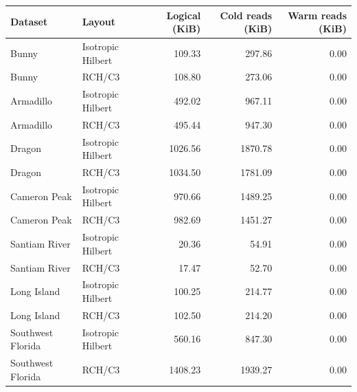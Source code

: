 \begin{tabular}{llrrr}
Dataset & Layout & Logical (KiB) & Cold reads (KiB) & Warm reads (KiB) \\
\hline
Bunny & Isotropic Hilbert & 109.33 & 297.86 & 0.00 \\
Bunny & RCH/C3 & 108.80 & 273.06 & 0.00 \\
Armadillo & Isotropic Hilbert & 492.02 & 967.11 & 0.00 \\
Armadillo & RCH/C3 & 495.44 & 947.30 & 0.00 \\
Dragon & Isotropic Hilbert & 1026.56 & 1870.78 & 0.00 \\
Dragon & RCH/C3 & 1034.50 & 1781.09 & 0.00 \\
Cameron Peak & Isotropic Hilbert & 970.66 & 1489.25 & 0.00 \\
Cameron Peak & RCH/C3 & 982.69 & 1451.27 & 0.00 \\
Santiam River & Isotropic Hilbert & 20.36 & 54.91 & 0.00 \\
Santiam River & RCH/C3 & 17.47 & 52.70 & 0.00 \\
Long Island & Isotropic Hilbert & 100.25 & 214.77 & 0.00 \\
Long Island & RCH/C3 & 102.50 & 214.20 & 0.00 \\
Southwest Florida & Isotropic Hilbert & 560.16 & 847.30 & 0.00 \\
Southwest Florida & RCH/C3 & 1408.23 & 1939.27 & 0.00 \\
\end{tabular}
